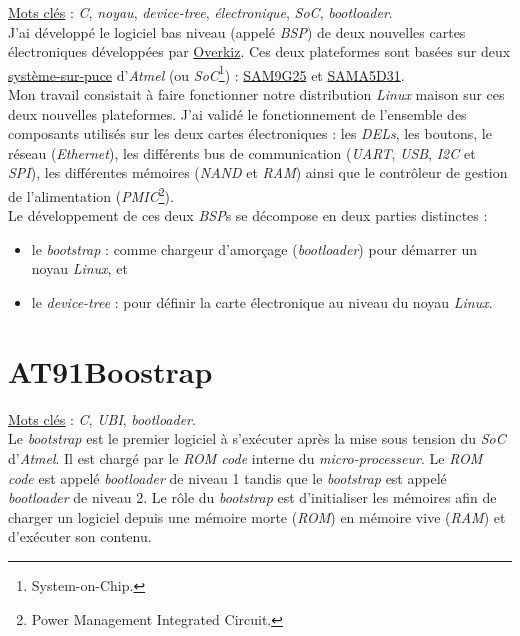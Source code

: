 \documentclass[a4paper]{article}
\begin{document}
\underline{Mots clés} : \textit{C}, \textit{noyau}, \textit{device-tree}, \textit{électronique}, \textit{SoC}, \textit{bootloader}.\\

J'ai développé le logiciel bas niveau (appelé \textit{BSP}) de deux nouvelles cartes électroniques développées par \href{http://www.overkiz.com/}{Overkiz}. Ces deux plateformes sont basées sur deux \href{https://fr.wikipedia.org/wiki/Syst\%C3\%A8me_sur_une_puce}{système-sur-puce} d'\textit{Atmel} (ou \textit{SoC}\footnote{System-on-Chip.}) : \href{http://www.atmel.com/devices/SAM9G25.aspx}{SAM9G25} et \href{http://www.atmel.com/products/microcontrollers/arm/sama5.aspx}{SAMA5D31}.\\

Mon travail consistait à faire fonctionner notre distribution \textit{Linux} maison sur ces deux nouvelles plateformes. J'ai validé le fonctionnement de l'ensemble des composants utilisés sur les deux cartes électroniques : les \textit{DELs}, les boutons, le réseau (\textit{Ethernet}), les différents bus de communication (\textit{UART}, \textit{USB}, \textit{I2C} et \textit{SPI}), les différentes mémoires (\textit{NAND} et \textit{RAM}) ainsi que le contrôleur de gestion de l'alimentation (\textit{PMIC}\footnote{Power Management Integrated Circuit.}).\\

Le développement de ces deux \textit{BSP}s se décompose en deux parties distinctes :
\begin{itemize}
\item le \textit{bootstrap} : comme chargeur d'amorçage (\textit{bootloader}) pour démarrer un noyau \textit{Linux}, et
\item le \textit{device-tree} : pour définir la carte électronique au niveau du noyau \textit{Linux}.
\end{itemize}

\section{AT91Boostrap}

\underline{Mots clés} : \textit{C}, \textit{UBI}, \textit{bootloader}.\\

Le \textit{bootstrap} est le premier logiciel à s’exécuter après la mise sous tension du \textit{SoC} d'\textit{Atmel}. Il est chargé par le \textit{ROM code} interne du \textit{micro-processeur}. Le \textit{ROM code} est appelé \textit{bootloader} de niveau 1 tandis que le \textit{bootstrap} est appelé \textit{bootloader} de niveau 2. Le rôle du \textit{bootstrap} est d’initialiser les mémoires afin de charger un logiciel depuis une mémoire morte (\textit{ROM}) en mémoire vive (\textit{RAM}) et d’exécuter son contenu. \\
\end{document}
